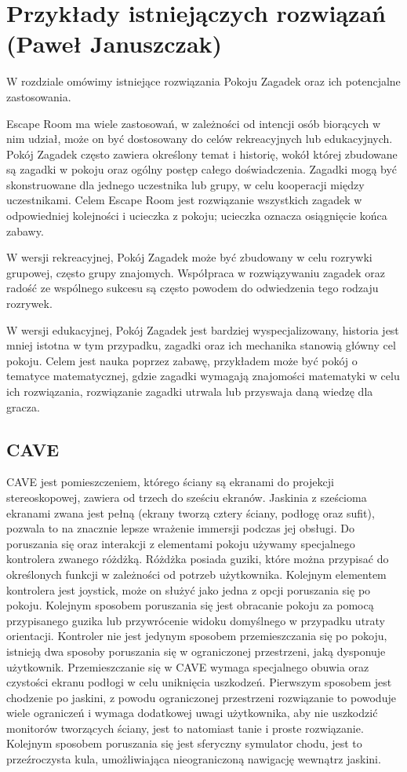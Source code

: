 \chapter{Przykłady istniejączych rozwiązań (Paweł Januszczak)}
\label{chap:field}

W rozdziale omówimy istniejące rozwiązania Pokoju Zagadek oraz ich potencjalne zastosowania.

Escape Room ma wiele zastosowań, w zależności od intencji osób biorących w nim udział, może on być dostosowany do celów rekreacyjnych lub edukacyjnych. Pokój Zagadek często zawiera określony temat i historię, wokół której zbudowane są zagadki w pokoju oraz ogólny postęp całego doświadczenia. 
Zagadki mogą być skonstruowane dla jednego uczestnika lub grupy, w celu kooperacji między uczestnikami. Celem Escape Room jest rozwiązanie wszystkich zagadek w odpowiedniej kolejności i ucieczka z pokoju; ucieczka oznacza osiągnięcie końca zabawy.

W wersji rekreacyjnej, Pokój Zagadek może być zbudowany w celu rozrywki grupowej, często grupy znajomych. Współpraca w rozwiązywaniu zagadek oraz radość ze wspólnego sukcesu są często powodem do odwiedzenia tego rodzaju rozrywek. 

W wersji edukacyjnej, Pokój Zagadek jest bardziej wyspecjalizowany, historia jest mniej istotna w tym przypadku, zagadki oraz ich mechanika stanowią główny cel pokoju.
Celem jest nauka poprzez zabawę, przykładem może być pokój o tematyce matematycznej, gdzie zagadki wymagają znajomości matematyki w celu ich rozwiązania, rozwiązanie zagadki utrwala lub przyswaja daną wiedzę dla gracza.

\section{CAVE}
CAVE jest pomieszczeniem, którego ściany są ekranami do projekcji stereoskopowej, zawiera od trzech do sześciu ekranów.
Jaskinia z sześcioma ekranami zwana jest pełną (ekrany tworzą cztery ściany, podłogę oraz sufit), pozwala to na znacznie lepsze wrażenie immersji podczas jej obsługi.
Do poruszania się oraz interakcji z elementami pokoju używamy specjalnego kontrolera zwanego różdżką. Różdżka posiada guziki, które można przypisać do określonych funkcji w zależności od potrzeb użytkownika. Kolejnym elementem kontrolera jest joystick, może on służyć jako jedna z opcji poruszania się po pokoju. Kolejnym sposobem poruszania się jest obracanie pokoju za pomocą przypisanego guzika lub przywrócenie widoku domyślnego w przypadku utraty orientacji.
Kontroler nie jest jedynym sposobem przemieszczania się po pokoju, istnieją dwa sposoby poruszania się w ograniczonej przestrzeni, jaką dysponuje użytkownik. Przemieszczanie się w CAVE wymaga specjalnego obuwia oraz czystości ekranu podłogi w celu uniknięcia uszkodzeń. Pierwszym sposobem jest chodzenie po jaskini, z powodu ograniczonej przestrzeni rozwiązanie to powoduje wiele ograniczeń i wymaga dodatkowej uwagi użytkownika, aby nie uszkodzić monitorów tworzących ściany, jest to natomiast tanie i proste rozwiązanie.
Kolejnym sposobem poruszania się jest sferyczny symulator chodu, jest to przeźroczysta kula, umożliwiająca nieograniczoną nawigację wewnątrz jaskini.


